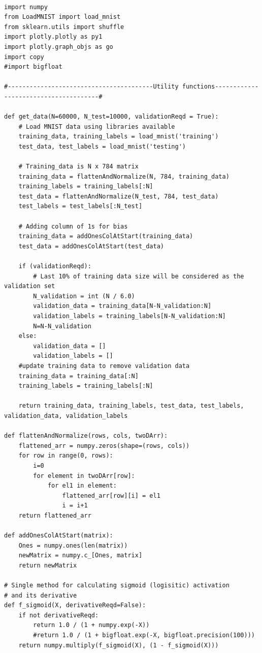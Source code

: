 \documentclass{article}
\begin{document}
\begin{lstlisting}

import numpy
from LoadMNIST import load_mnist
from sklearn.utils import shuffle
import plotly.plotly as py1
import plotly.graph_objs as go
import copy
#import bigfloat

#----------------------------------------Utility functions--------------------------------------#

def get_data(N=60000, N_test=10000, validationReqd = True):
    # Load MNIST data using libraries available
    training_data, training_labels = load_mnist('training')    
    test_data, test_labels = load_mnist('testing')
    
    # Training_data is N x 784 matrix
    training_data = flattenAndNormalize(N, 784, training_data) 
    training_labels = training_labels[:N]
    test_data = flattenAndNormalize(N_test, 784, test_data)
    test_labels = test_labels[:N_test]

    # Adding column of 1s for bias
    training_data = addOnesColAtStart(training_data)
    test_data = addOnesColAtStart(test_data)
    
    if (validationReqd):
        # Last 10% of training data size will be considered as the validation set
        N_validation = int (N / 6.0)
        validation_data = training_data[N-N_validation:N]
        validation_labels = training_labels[N-N_validation:N]
        N=N-N_validation
    else:
        validation_data = []
        validation_labels = []
    #update training data to remove validation data
    training_data = training_data[:N]
    training_labels = training_labels[:N]    

    return training_data, training_labels, test_data, test_labels, validation_data, validation_labels
    
def flattenAndNormalize(rows, cols, twoDArr):
    flattened_arr = numpy.zeros(shape=(rows, cols))
    for row in range(0, rows):
        i=0
        for element in twoDArr[row]:
            for el1 in element:
                flattened_arr[row][i] = el1
                i = i+1
    return flattened_arr

def addOnesColAtStart(matrix):
    Ones = numpy.ones(len(matrix))
    newMatrix = numpy.c_[Ones, matrix]
    return newMatrix
    
# Single method for calculating sigmoid (logisitic) activation 
# and its derivative
def f_sigmoid(X, derivativeReqd=False):
    if not derivativeReqd:
        return 1.0 / (1 + numpy.exp(-X))
        #return 1.0 / (1 + bigfloat.exp(-X, bigfloat.precision(100)))
    return numpy.multiply(f_sigmoid(X), (1 - f_sigmoid(X)))


\end{lstlisting}
\end{document}
